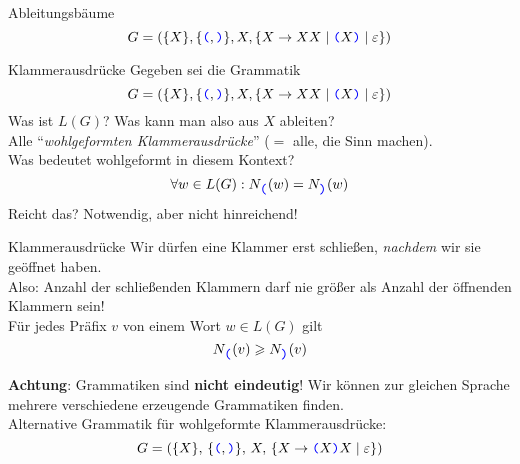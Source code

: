 \begin{frame}{Ableitungsbäume}
	$$G = (\{X\}, \{\hbox{\textcolor{blue}{\texttt{(}}}, \hbox{\textcolor{blue}{\texttt{)}}}\}, X, \{X \to XX \mid \hbox{\textcolor{blue}{\texttt{(}}}X\hbox{\textcolor{blue}{\texttt{)}}} \mid \varepsilon\})$$
	\pause
\end{frame}


\begin{frame}{Klammerausdrücke}
	Gegeben sei die Grammatik $$G = (\{X\}, \{\hbox{\textcolor{blue}{\texttt{(}}}, \hbox{\textcolor{blue}{\texttt{)}}}\}, X, \{X \to XX \mid \hbox{\textcolor{blue}{\texttt{(}}}X\hbox{\textcolor{blue}{\texttt{)}}} \mid \varepsilon\})$$
	Was ist $L(G)$? Was kann man also aus $X$ ableiten?\\ \pause 
	Alle \enquote{\textit{wohlgeformten Klammerausdrücke}} \quad ($=$ alle, die Sinn machen).\\[1em]
	
	Was bedeutet wohlgeformt in diesem Kontext?\\ \pause
	$$\forall w \in L(G): N_{\hbox{\textcolor{blue}{\texttt{(}}}}(w) = N_{\hbox{\textcolor{blue}{\texttt{)}}}}(w)$$ 
	Reicht das? \pause \impl Notwendig, aber nicht hinreichend! 

\end{frame}

\begin{frame}{Klammerausdrücke}
	Wir dürfen eine Klammer erst schließen, \textit{nachdem} wir sie geöffnet haben.\\
	Also: Anzahl der schließenden Klammern darf nie größer als Anzahl der öffnenden Klammern sein! \pause \\[1em]
	\impl Für jedes Präfix $v$ von einem Wort $w \in L(G)$ gilt $$N_{\hbox{\textcolor{blue}{\texttt{(}}}} (v) \geqslant N_{\hbox{\textcolor{blue}{\texttt{)}}}} (v)$$ \pause
	
	\textbf{Achtung}: Grammatiken sind \textbf{nicht eindeutig}! Wir können zur gleichen Sprache mehrere verschiedene erzeugende Grammatiken finden. \\
	Alternative Grammatik für wohlgeformte Klammerausdrücke: \pause $$G = (\{X\}, \, \{\hbox{\textcolor{blue}{\texttt{(}}}, \hbox{\textcolor{blue}{\texttt{)}}}\}, \, X, \, \{X \to \hbox{\textcolor{blue}{\texttt{(}}}X\hbox{\textcolor{blue}{\texttt{)}}}X \mid \varepsilon\})$$
\end{frame}

